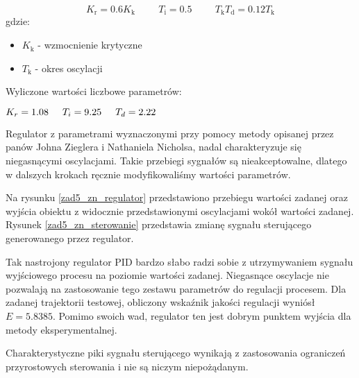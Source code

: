 \begin{equation}
\label{zad5_zn_wzory}
K_{\mathrm{r}}=\num{0,6}K_{\mathrm{k}} \hspace{1cm} T_{\mathrm{i}}=\num{0,5} \hspace{1cm} T_{\mathrm{k}} T_{\mathrm{d}}=\num{0,12} T_{\mathrm{k}}
\end{equation}
gdzie:
\begin{center}
\begin{itemize}
    \item $K_{\mathrm{k}}$ - wzmocnienie krytyczne
    \item $T_{\mathrm{k}}$ - okres oscylacji
\end{itemize}
\end{center}

Wyliczone wartości liczbowe parametrów:
\begin{center}
$K_{r}=\num{1,08} \hspace{0.5 cm}
T_{i}=\num{9,25}   \hspace{0.5 cm}
T_{d}=\num{2,22}$
\end{center}

Regulator z parametrami wyznaczonymi przy pomocy metody opisanej przez panów Johna Zieglera
i Nathaniela Nicholsa, nadal charakteryzuje się niegasnącymi oscylacjami. Takie 
przebiegi sygnałów są nieakceptowalne, dlatego w dalszych krokach ręcznie modyfikowaliśmy 
wartości parametrów. 

Na rysunku \ref{zad5_zn_regulator} przedstawiono przebiegu wartości zadanej oraz
wyjścia obiektu z widocznie przedstawionymi oscylacjami wokół wartości zadanej.
Rysunek \ref{zad5_zn_sterowanie} przedstawia zmianę sygnału sterującego
generowanego przez regulator.

Tak nastrojony regulator PID bardzo słabo radzi sobie z utrzymywaniem sygnału wyjściowego
procesu na poziomie wartości zadanej. Niegasnące oscylacje nie pozwalają na zastosowanie
tego zestawu parametrów do regulacji procesem. Dla zadanej trajektorii testowej, obliczony 
wskaźnik jakości regulacji wyniósł $E = \num{5,8385}$. Pomimo swoich wad, regulator ten jest 
dobrym punktem wyjścia dla metody eksperymentalnej.

Charakterystyczne piki sygnału sterującego wynikają z zastosowania ograniczeń przyrostowych sterowania i nie 
są niczym niepożądanym. 

